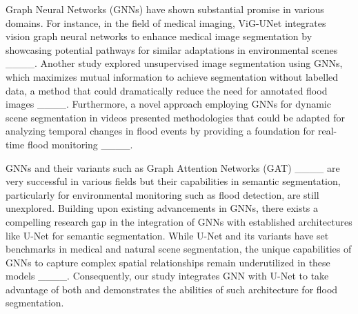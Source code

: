 Graph Neural Networks (GNNs) have shown substantial promise in various domains. For instance, in the field of medical imaging, ViG-UNet integrates vision graph neural networks to enhance medical image segmentation by showcasing potential pathways for similar adaptations in environmental scenes ____. Another study explored unsupervised image segmentation using GNNs, which maximizes mutual information to achieve segmentation without labelled data, a method that could dramatically reduce the need for annotated flood images ____. Furthermore, a novel approach employing GNNs for dynamic scene segmentation in videos presented methodologies that could be adapted for analyzing temporal changes in flood events by providing a foundation for real-time flood monitoring ____. 

GNNs and their variants such as Graph Attention Networks (GAT) ____ are very successful in various fields but their capabilities in semantic segmentation, particularly for environmental monitoring such as flood detection, are still unexplored. Building upon existing advancements in GNNs, there exists a compelling research gap in the integration of GNNs with established architectures like U-Net for semantic segmentation. While U-Net and its variants have set benchmarks in medical and natural scene segmentation, the unique capabilities of GNNs to capture complex spatial relationships remain underutilized in these models ____. Consequently, our study integrates GNN with U-Net to take advantage of both and demonstrates the abilities of such architecture for flood segmentation.